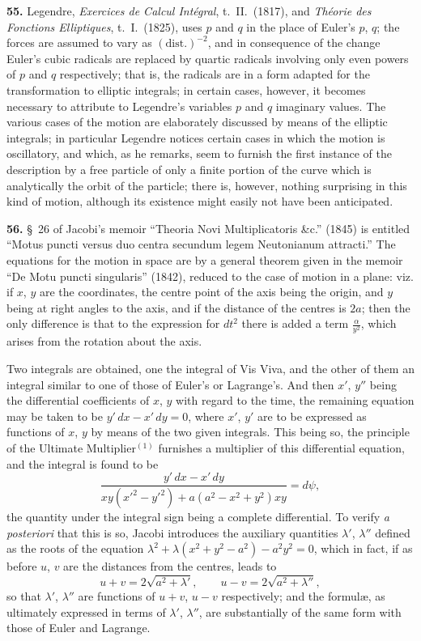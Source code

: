 \documentclass[11pt,a4paper]{article}
\theoremstyle{definition}
\begin{document}
\textbf{55.} Legendre, \textit{Exercices de Calcul Int\'egral}, t.~II.~(1817), and \textit{Th\'eorie des Fonctions Elliptiques}, t.~I.~(1825), uses $p$ and $q$ in the place of Euler's $p$, $q$; the forces are assumed to vary as $(\text{dist.})^{-2}$, and in consequence of the change Euler's cubic radicals are replaced by quartic radicals involving only even powers of $p$ and $q$ respectively; that is, the radicals are in a form adapted for the transformation to elliptic integrals; in certain cases, however, it becomes necessary to attribute to Legendre's variables $p$ and $q$ imaginary values. The various cases of the motion are elaborately discussed by means of the elliptic integrals; in particular Legendre notices certain cases in which the motion is oscillatory, and which, as he remarks, seem to furnish the first instance of the description by a free particle of only a finite portion of the curve which is analytically the orbit of the particle; there is, however, nothing surprising in this kind of motion, although its existence might easily not have been anticipated.

\textbf{56.} \S~26 of Jacobi's memoir ``Theoria Novi Multiplicatoris \&c.'' (1845) is entitled ``Motus puncti versus duo centra secundum legem Neutonianum attracti.'' The equations for the motion in space are by a general theorem given in the memoir ``De Motu puncti singularis'' (1842), reduced to the case of motion in a plane: viz. if $x$, $y$ are the coordinates, the centre point of the axis being the origin, and $y$ being at right angles to the axis, and if the distance of the centres is $2a$; then the only difference is that to the expression for $dt^2$ there is added a term $\frac{\alpha}{y^2}$, which arises from the rotation about the axis.

Two integrals are obtained, one the integral of Vis Viva, and the other of them an integral similar to one of those of Euler's or Lagrange's. And then $x'$, $y''$ being the differential coefficients of $x$, $y$ with regard to the time, the remaining equation may be taken to be $y'\,dx - x'\,dy = 0$, where $x'$, $y'$ are to be expressed as functions of $x$, $y$ by means of the two given integrals. This being so, the principle of the Ultimate Multiplier$^{(1)}$ furnishes a multiplier of this differential equation, and the integral is found to be
\[
\frac{y'\,dx - x'\,dy}{xy(x'^2 - y'^2) + a(a^2 - x^2 + y^2)xy} = d\psi,
\]
the quantity under the integral sign being a complete differential. To verify \textit{a posteriori} that this is so, Jacobi introduces the auxiliary quantities $\lambda'$, $\lambda''$ defined as the roots of the equation $\lambda^2 + \lambda(x^2 + y^2 - a^2) - a^2y^2 = 0$, which in fact, if as before $u$, $v$ are the distances from the centres, leads to
\[
u + v = 2\sqrt{a^2 + \lambda'}, \qquad u - v = 2\sqrt{a^2 + \lambda''},
\]
so that $\lambda'$, $\lambda''$ are functions of $u+v$, $u-v$ respectively; and the formul\ae, as ultimately expressed in terms of $\lambda'$, $\lambda''$, are substantially of the same form with those of Euler and Lagrange.
\end{document}
